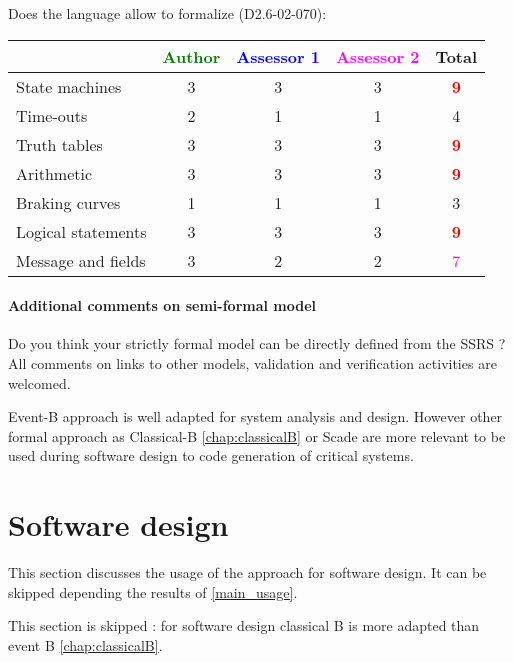 Does the language allow to  formalize (D2.6-02-070):

\begin{tabular}{|l | c | c | c | c|}
\hline
& \textcolor{green}{Author} & \textcolor{blue}{Assessor 1} & \textcolor{magenta}{Assessor 2} & Total \\
\hline 
State machines  & 3     & 3     & 3     & \textcolor{red}{\textbf{9}} \\
\hline
Time-outs  & 2     & 1     & 1     & 4     \\
\hline
Truth tables  & 3     & 3     & 3     & \textcolor{red}{\textbf{9}} \\
\hline
Arithmetic  & 3     & 3     & 3     & \textcolor{red}{\textbf{9}} \\
\hline
Braking curves  & 1     & 1     & 1     & 3     \\
\hline
Logical statements & 3     & 3     & 3     & \textcolor{red}{\textbf{9}} \\
\hline
Message and fields & 3     & 2     & 2     & \textcolor{magenta}{7}  \\
\hline
\end{tabular}

\paragraph{Additional comments on semi-formal  model} Do you think your strictly formal  model can be directly defined from the SSRS ?
All comments on links to  other models, validation and verification activities are welcomed.


\begin{author_comment}
Event-B  approach is well adapted for system analysis and design. However other formal approach as Classical-B \ref{chap:classicalB} or Scade are more relevant to be used during software design to code generation of critical systems.
\end{author_comment}


\section{Software design}
This section discusses the usage of the approach for software design.
It can be skipped depending the results of \ref{main_usage}.


\begin{author_comment}
This section is skipped :  for software design classical B is more adapted than event B \ref{chap:classicalB}.
\end{author_comment}



